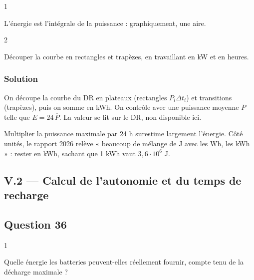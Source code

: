 \documentclass[11pt,a4paper]{article}
\newcommand{\equationajustee}[1]{%
  \sbox{\boiteequation}{$\displaystyle #1$}%
  \ifdim\wd\boiteequation>\linewidth
    \[\resizebox{\linewidth}{!}{\usebox{\boiteequation}}\]%
  \else
    \[#1\]%
  \fi}
\begin{document}
\begin{indication}{1}

L'énergie est l'intégrale de la puissance : graphiquement, une aire.

\end{indication}

\begin{indication}{2}

Découper la courbe en rectangles et trapèzes, en travaillant en kW et en heures.

\end{indication}

\hypertarget{solution-34}{%
\subsubsection{Solution}\label{solution-34}}

\equationajustee{E=\int_0^{24\ \mathrm h}P(t)\,\mathrm dt}

On découpe la courbe du DR en plateaux (rectangles \(P_i\Delta t_i\)) et transitions (trapèzes), puis on somme en kWh. On contrôle avec une puissance moyenne \(\overline P\) telle que \(E=24\,\overline P\). La valeur se lit sur le DR, non disponible ici.

\begin{piege}

Multiplier la puissance maximale par 24 h surestime largement l'énergie. Côté unités, le rapport 2026 relève « beaucoup de mélange de J avec les Wh, les kWh » : rester en kWh, sachant que 1 kWh vaut \(3{,}6\cdot10^6\) J.

\end{piege}

\hypertarget{v.2-calcul-de-lautonomie-et-du-temps-de-recharge}{%
\subsection{V.2 --- Calcul de l'autonomie et du temps de recharge}\label{v.2-calcul-de-lautonomie-et-du-temps-de-recharge}}

\hypertarget{question-36}{%
\subsection{Question 36}\label{question-36}}

\begin{indication}{1}

Quelle énergie les batteries peuvent-elles réellement fournir, compte tenu de la décharge maximale ?

\end{indication}
\end{document}
